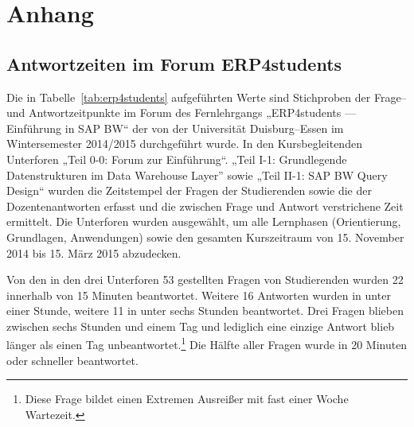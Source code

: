 \appendix
\section{Anhang} %
\label{sec:anhang}

\subsection{Antwortzeiten im Forum ERP4students} %
\label{sub:antwortzeiten_im_forum_erp4students}
Die in Tabelle~\ref{tab:erp4students} aufgeführten Werte sind Stichproben der Frage– und Antwortzeitpunkte im Forum des Fernlehrgangs „ERP4students — Einführung in SAP BW“ der von der Universität Duisburg–Essen im Wintersemester 2014/2015 durchgeführt wurde. In den Kursbegleitenden Unterforen „Teil 0-0: Forum zur Einführung“. „Teil I-1: Grundlegende Datenstrukturen im Data Warehouse Layer” sowie „Teil II-1: SAP BW Query Design“ wurden die Zeitstempel der Fragen der Studierenden sowie die der Dozentenantworten erfasst und die zwischen Frage und Antwort verstrichene Zeit ermittelt. Die Unterforen wurden ausgewählt, um alle Lernphasen (Orientierung, Grundlagen, Anwendungen) sowie den gesamten Kurszeitraum von 15. November 2014 bis 15. März 2015 abzudecken.

Von den in den drei Unterforen 53 gestellten Fragen von Studierenden wurden 22 innerhalb von 15 Minuten beantwortet. Weitere 16 Antworten wurden in unter einer Stunde, weitere 11 in unter sechs Stunden beantwortet. Drei Fragen blieben zwischen sechs Stunden und einem Tag und lediglich eine einzige Antwort blieb länger als einen Tag unbeantwortet.\footnote{Diese Frage bildet einen Extremen Ausreißer mit fast einer Woche Wartezeit.} Die Hälfte aller Fragen wurde in 20 Minuten oder schneller beantwortet.


